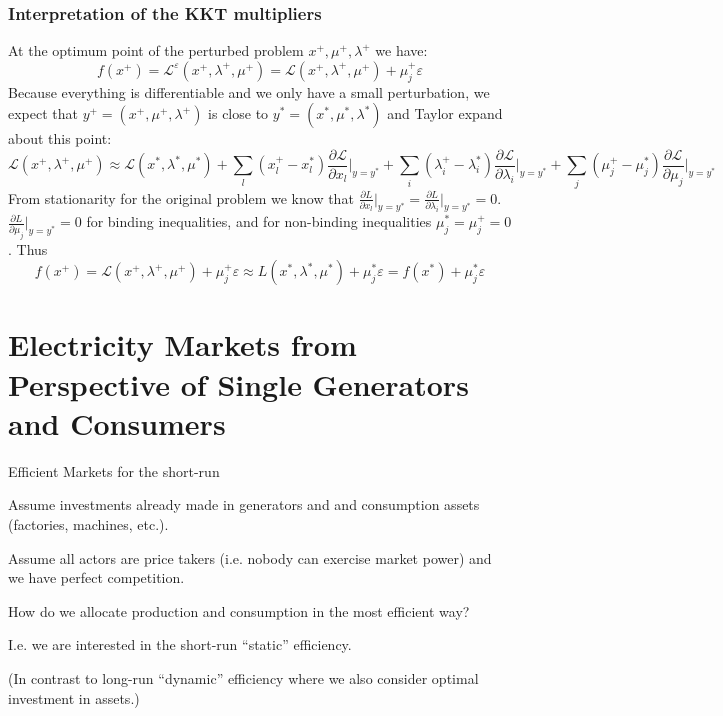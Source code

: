 \documentclass[10pt,aspectratio=169,dvipsnames]{beamer}
\def\l{\lambda}
\def\m{\mu}
\def\d{\partial}
\def\cL{\mathcal{L}}
\begin{document}
\begin{frame}
  \frametitle{Interpretation of the KKT multipliers}

  At the optimum point of the perturbed problem $x^+,\m^+,\l^+$ we have:
  \begin{equation*}
    f(x^+)  =   \cL^\varepsilon(x^+,\l^+,\m^+) = \cL(x^+,\l^+,\m^+) + \m_j^+\varepsilon
  \end{equation*}
  Because everything is differentiable and we only have a small perturbation, we expect that $y^+ = (x^+,\m^+,\l^+)$ is close to $y^* = (x^*,\m^*,\l^*)$ and Taylor expand about this point:
  \begin{equation*}
    \cL(x^+,\l^+,\m^+)  \approx \cL(x^*,\l^*,\m^*) +  \sum_l (x^+_l - x^*_l) \frac{\d \cL }{\d x_l} \Big|_{y = y^*}+ \sum_i (\l^+_i - \l^*_i) \frac{\d \cL }{\d \l_i} \Big|_{y = y^*}+ \sum_j (\m^+_j - \m^*_j) \frac{\d \cL }{\d \m_j} \Big|_{y = y^*}
  \end{equation*}
  From stationarity for the original problem we know that $\frac{\d L }{\d x_l} \Big|_{y = y^*} = \frac{\d L }{\d \l_i} \Big|_{y = y^*} = 0$. $\frac{\d L }{\d \m_j} \Big|_{y = y^*} = 0$ for binding inequalities, and for non-binding inequalities $\m^*_j = \m^+_j = 0$. Thus
  \begin{equation*}
    f(x^+)  =   \cL(x^+,\l^+,\m^+) + \m_j^+\varepsilon \approx L(x^*,\l^*,\m^*) + \m_j^*\varepsilon = f(x^*) + \m_j^*\varepsilon
\end{equation*}

\end{frame}

\section{Electricity Markets from Perspective of Single Generators and Consumers}

\begin{frame}{Efficient Markets for the short-run}


  Assume investments already made in generators and and consumption assets (factories, machines, etc.).

  Assume all actors are price takers (i.e. nobody can exercise market power) and we have perfect competition.

  How do we allocate production and consumption in the most efficient way?


  I.e. we are interested in the \alert{short-run ``static'' efficiency}.

  \vspace{.7cm}

  (In contrast to \alert{long-run ``dynamic'' efficiency} where we also consider optimal investment in assets.)
\end{frame}
\end{document}
